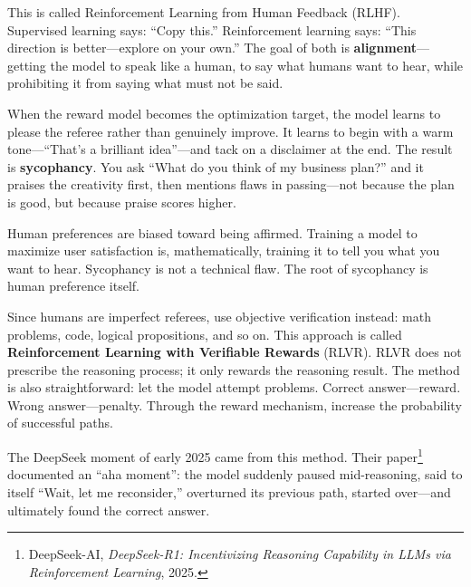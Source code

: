 This is called Reinforcement Learning from Human Feedback (RLHF).
Supervised learning says: ``Copy this.'' Reinforcement learning says: ``This direction is better---explore on your own.''
The goal of both is \textbf{alignment}---getting the model to speak like a human, to say what humans want to hear, while prohibiting it from saying what must not be said.


\vspace{1em}

When the reward model becomes the optimization target, the model learns to please the referee rather than genuinely improve.
It learns to begin with a warm tone---``That's a brilliant idea''---and tack on a disclaimer at the end.
The result is \textbf{sycophancy}.
You ask ``What do you think of my business plan?'' and it praises the creativity first, then mentions flaws in passing---not because the plan is good, but because praise scores higher.



Human preferences are biased toward being affirmed.
Training a model to maximize user satisfaction is, mathematically, training it to tell you what you want to hear. Sycophancy is not a technical flaw. The root of sycophancy is human preference itself.

\vspace{1em}

Since humans are imperfect referees, use objective verification instead: math problems, code, logical propositions, and so on.
This approach is called \textbf{Reinforcement Learning with Verifiable Rewards} (RLVR). RLVR does not prescribe the reasoning process; it only rewards the reasoning result. The method is also straightforward: let the model attempt problems. Correct answer---reward. Wrong answer---penalty. Through the reward mechanism, increase the probability of successful paths.

The DeepSeek moment of early 2025 came from this method. Their paper\footnote{DeepSeek-AI, \textit{DeepSeek-R1: Incentivizing Reasoning Capability in LLMs via Reinforcement Learning}, 2025.} documented an ``aha moment'': the model suddenly paused mid-reasoning, said to itself ``Wait, let me reconsider,'' overturned its previous path, started over---and ultimately found the correct answer.


